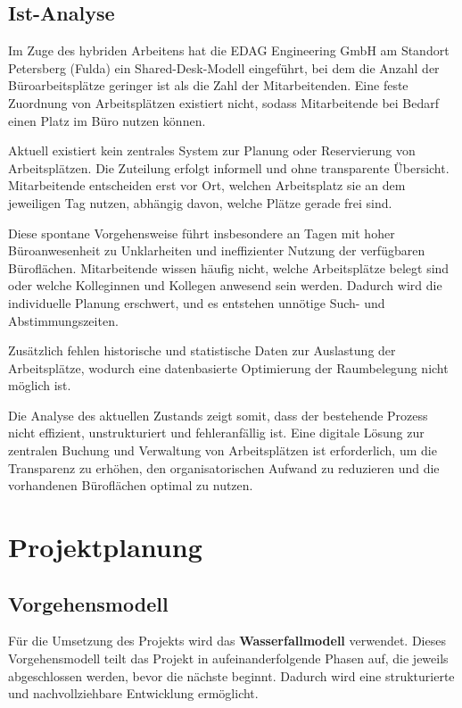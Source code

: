 \documentclass[11pt,a4paper]{report}
\begin{document}
\section{Ist-Analyse}

Im Zuge des hybriden Arbeitens hat die EDAG Engineering GmbH am Standort Petersberg (Fulda) ein Shared-Desk-Modell eingeführt, bei dem die Anzahl der Büroarbeitsplätze geringer ist als die Zahl der Mitarbeitenden. Eine feste Zuordnung von Arbeitsplätzen existiert nicht, sodass Mitarbeitende bei Bedarf einen Platz im Büro nutzen können.

Aktuell existiert kein zentrales System zur Planung oder Reservierung von Arbeitsplätzen. Die Zuteilung erfolgt informell und ohne transparente Übersicht. Mitarbeitende entscheiden erst vor Ort, welchen Arbeitsplatz sie an dem jeweiligen Tag nutzen, abhängig davon, welche Plätze gerade frei sind. 

Diese spontane Vorgehensweise führt insbesondere an Tagen mit hoher Büroanwesenheit zu Unklarheiten und ineffizienter Nutzung der verfügbaren Büroflächen. Mitarbeitende wissen häufig nicht, welche Arbeitsplätze belegt sind oder welche Kolleginnen und Kollegen anwesend sein werden. Dadurch wird die individuelle Planung erschwert, und es entstehen unnötige Such- und Abstimmungszeiten.

Zusätzlich fehlen historische und statistische Daten zur Auslastung der Arbeitsplätze, wodurch eine datenbasierte Optimierung der Raumbelegung nicht möglich ist.

Die Analyse des aktuellen Zustands zeigt somit, dass der bestehende Prozess nicht effizient, unstrukturiert und fehleranfällig ist. Eine digitale Lösung zur zentralen Buchung und Verwaltung von Arbeitsplätzen ist erforderlich, um die Transparenz zu erhöhen, den organisatorischen Aufwand zu reduzieren und die vorhandenen Büroflächen optimal zu nutzen.

\chapter{Projektplanung} 

\section{Vorgehensmodell}

Für die Umsetzung des Projekts wird das \textbf{Wasserfallmodell} verwendet. 
Dieses Vorgehensmodell teilt das Projekt in aufeinanderfolgende Phasen auf, 
die jeweils abgeschlossen werden, bevor die nächste beginnt. 
Dadurch wird eine strukturierte und nachvollziehbare Entwicklung ermöglicht.
\end{document}
